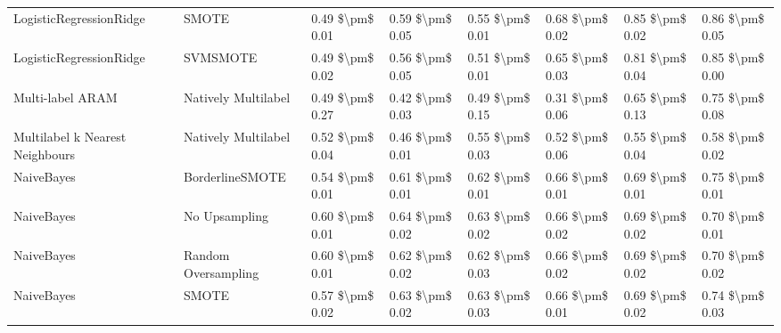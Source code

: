 \begin{tabular}{llllllll}
        LogisticRegressionRidge &                         SMOTE &     0.49 \$\textbackslash pm\$ 0.01 &           0.59 \$\textbackslash pm\$ 0.05 &       0.55 \$\textbackslash pm\$ 0.01 &        0.68 \$\textbackslash pm\$ 0.02 &                         0.85 \$\textbackslash pm\$ 0.02 & 0.86 \$\textbackslash pm\$ 0.05 \\
        LogisticRegressionRidge &                      SVMSMOTE &     0.49 \$\textbackslash pm\$ 0.02 &           0.56 \$\textbackslash pm\$ 0.05 &       0.51 \$\textbackslash pm\$ 0.01 &        0.65 \$\textbackslash pm\$ 0.03 &                         0.81 \$\textbackslash pm\$ 0.04 & 0.85 \$\textbackslash pm\$ 0.00 \\
               Multi-label ARAM &           Natively Multilabel &     0.49 \$\textbackslash pm\$ 0.27 &           0.42 \$\textbackslash pm\$ 0.03 &       0.49 \$\textbackslash pm\$ 0.15 &        0.31 \$\textbackslash pm\$ 0.06 &                         0.65 \$\textbackslash pm\$ 0.13 & 0.75 \$\textbackslash pm\$ 0.08 \\
Multilabel k Nearest Neighbours &           Natively Multilabel &     0.52 \$\textbackslash pm\$ 0.04 &           0.46 \$\textbackslash pm\$ 0.01 &       0.55 \$\textbackslash pm\$ 0.03 &        0.52 \$\textbackslash pm\$ 0.06 &                         0.55 \$\textbackslash pm\$ 0.04 & 0.58 \$\textbackslash pm\$ 0.02 \\
                     NaiveBayes &               BorderlineSMOTE &     0.54 \$\textbackslash pm\$ 0.01 &           0.61 \$\textbackslash pm\$ 0.01 &       0.62 \$\textbackslash pm\$ 0.01 &        0.66 \$\textbackslash pm\$ 0.01 &                         0.69 \$\textbackslash pm\$ 0.01 & 0.75 \$\textbackslash pm\$ 0.01 \\
                     NaiveBayes &                 No Upsampling &     0.60 \$\textbackslash pm\$ 0.01 &           0.64 \$\textbackslash pm\$ 0.02 &       0.63 \$\textbackslash pm\$ 0.02 &        0.66 \$\textbackslash pm\$ 0.02 &                         0.69 \$\textbackslash pm\$ 0.02 & 0.70 \$\textbackslash pm\$ 0.01 \\
                     NaiveBayes &           Random Oversampling &     0.60 \$\textbackslash pm\$ 0.01 &           0.62 \$\textbackslash pm\$ 0.02 &       0.62 \$\textbackslash pm\$ 0.03 &        0.66 \$\textbackslash pm\$ 0.02 &                         0.69 \$\textbackslash pm\$ 0.02 & 0.70 \$\textbackslash pm\$ 0.02 \\
                     NaiveBayes &                         SMOTE &     0.57 \$\textbackslash pm\$ 0.02 &           0.63 \$\textbackslash pm\$ 0.02 &       0.63 \$\textbackslash pm\$ 0.03 &        0.66 \$\textbackslash pm\$ 0.01 &                         0.69 \$\textbackslash pm\$ 0.02 & 0.74 \$\textbackslash pm\$ 0.03 \\

\end{tabular}
